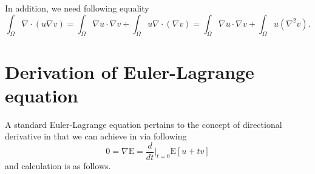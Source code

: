 \documentclass[fontsize=12pt]{article}
\begin{document}
In addition, we need following equality
\begin{equation}
\int_{\Omega} \nabla \cdot (u \nabla v) = 
\int_{\Omega} \nabla u \cdot \nabla v
+ \int_{\Omega} u \nabla \cdot (\nabla v)
= \int_{\Omega} \nabla u \cdot \nabla v
+ \int_{\Omega} u (\nabla^2 v).
\end{equation}




\section{Derivation of Euler-Lagrange equation}

A standard Euler-Lagrange equation pertains to the concept of directional derivative in that we can achieve in via following
\begin{equation}
0 = \nabla \mathrm{E}= \frac{d}{dt} \Big\vert_{t = 0} \mathrm{E}[u+tv]
\end{equation}
and calculation is as follows.
\end{document}
